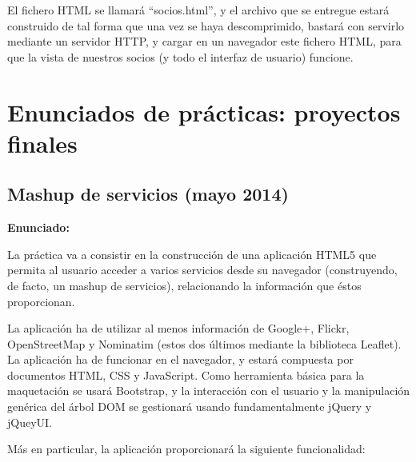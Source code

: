 El fichero HTML se llamará ``socios.html'', y el archivo que se entregue estará construido de tal forma que una vez se haya descomprimido, bastará con servirlo mediante un servidor HTTP, y cargar en un navegador este fichero HTML, para que la vista de nuestros socios (y todo el interfaz de usuario) funcione.


\chapter{Enunciados de prácticas: proyectos finales}

\section{Mashup de servicios (mayo 2014)}
\label{sec:final-14-mayo}

\textbf{Enunciado:}

La práctica va a consistir en la construcción de una aplicación HTML5 que permita al usuario acceder a varios servicios desde su navegador (construyendo, de facto, un mashup de servicios), relacionando la información que éstos proporcionan.

La aplicación ha de utilizar al menos información de Google+, Flickr, OpenStreetMap y Nominatim (estos dos últimos mediante la biblioteca Leaflet). La aplicación ha de funcionar en el navegador, y estará compuesta por documentos HTML, CSS y JavaScript. Como herramienta básica para la maquetación se usará Bootstrap, y la interacción con el usuario y la manipulación genérica del árbol DOM se gestionará usando fundamentalmente jQuery y jQueyUI.

Más en particular, la aplicación proporcionará la siguiente funcionalidad:

